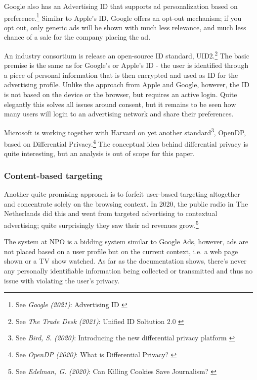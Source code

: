 Google also has an Advertising ID that supports ad personalization based on preference.\footnote{See \textit{Google (2021)}: Advertising ID \cite{advertisingId}} Similar to Apple's ID, Google offers an opt-out mechanism; if you opt out, only generic ads will be shown with much less relevance, and much less chance of a sale for the company placing the ad.

An industry consortium is release an open-source ID standard, UID2.\footnote{See \textit{The Trade Desk (2021)}: Unified ID Soltution 2.0 \cite{tradeDesk}} The basic premise is the same as for Google's or Apple's ID - the user is identified through a piece of personal information that is then encrypted and used as ID for the advertising profile. Unlike the approach from Apple and Google, however, the ID is not based on the device or the browser, but requires an active login. Quite elegantly this solves all issues around consent, but it remains to be seen how many users will login to an advertising network and share their preferences.

Microsoft is working together with Harvard on yet another standard\footnote{See \textit{Bird, S. (2020)}: Introducing the new differential privacy platform \cite{openDp}}, \href{https://opendp.org/}{OpenDP}, based on Differential Privacy.\footnote{See \textit{OpenDP (2020)}: What is Differential Privacy? \cite{diffPrivacy}} The conceptual idea behind differential privacy is quite interesting, but an analysis is out of scope for this paper.

\subsubsection{Content-based targeting}

Another quite promising approach is to forfeit user-based targeting altogether and concentrate solely on the browsing context. In 2020, the public radio in The Netherlands did this and went from targeted advertising to contextual advertising; quite surprisingly they saw their ad revenues grow.\footnote{See \textit{Edelman, G. (2020)}: Can Killing Cookies Save Journalism? \cite{killingCookies}} 

The system at \href{https://over.npo.nl/}{NPO} is a bidding system similar to Google Ads, however, ads are not placed based on a user profile but on the current context, i.e. a web page shown or a TV show watched. As far as the documentation shows, there's never any personally identifiable information being collected or transmitted and thus no issue with violating the user's privacy.

